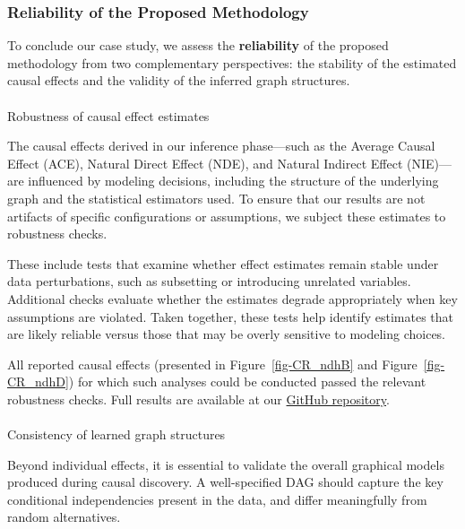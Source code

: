 \documentclass[
]{article}
\makeatletter
\let\oldparagraph\paragraph
\renewcommand{\paragraph}{
    \@ifstar
      \xxxParagraphStar
      \xxxParagraphNoStar
  }
\newcommand{\xxxParagraphStar}[1]{\oldparagraph*{#1}\mbox{}}
\newcommand{\xxxParagraphNoStar}[1]{\oldparagraph{#1}\mbox{}}
\theoremstyle{definition}
\theoremstyle{remark}
\makeatother
\begin{document}
\subsubsection{Reliability of the Proposed
Methodology}\label{sec-Reliability}

To conclude our case study, we assess the \textbf{reliability} of the
proposed methodology from two complementary perspectives: the stability
of the estimated causal effects and the validity of the inferred graph
structures.

\paragraph{Robustness of causal effect
estimates}\label{robustness-of-causal-effect-estimates}

The causal effects derived in our inference phase---such as the Average
Causal Effect (ACE), Natural Direct Effect (NDE), and Natural Indirect
Effect (NIE)---are influenced by modeling decisions, including the
structure of the underlying graph and the statistical estimators used.
To ensure that our results are not artifacts of specific configurations
or assumptions, we subject these estimates to robustness checks.

These include tests that examine whether effect estimates remain stable
under data perturbations, such as subsetting or introducing unrelated
variables. Additional checks evaluate whether the estimates degrade
appropriately when key assumptions are violated. Taken together, these
tests help identify estimates that are likely reliable versus those that
may be overly sensitive to modeling choices.

All reported causal effects (presented in Figure~\ref{fig-CR_ndhB} and
Figure~\ref{fig-CR_ndhD}) for which such analyses could be conducted
passed the relevant robustness checks. Full results are available at our
\href{https://github.com/rmartosprieto/chloroDAG.git}{GitHub
repository}.

\paragraph{Consistency of learned graph
structures}\label{sec-fals_tests}

Beyond individual effects, it is essential to validate the overall
graphical models produced during causal discovery. A well-specified DAG
should capture the key conditional independencies present in the data,
and differ meaningfully from random alternatives.
\end{document}

